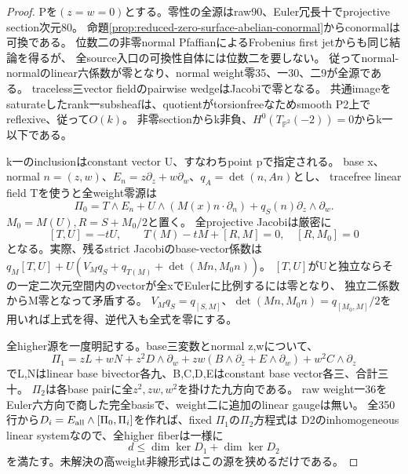 \documentclass[a4paper,11pt]{ltjsarticle}
\theoremstyle{definition}
\begin{document}
\begin{proof}
Pを$(z=w=0)$とする。零性の全源はraw90、Euler冗長十でprojective section次元80。
命題\ref{prop:reduced-zero-surface-abelian-conormal}からconormalは可換である。
位数二の非零normal PfaffianによるFrobenius first jetからも同じ結論を得るが、
全source入口の可換性自体には位数二を要しない。
従ってnormal-normalのlinear六係数が零となり、normal weight零35、一30、二9が全源である。
traceless三vector fieldのpairwise wedgeはJacobiで零となる。
共通imageをsaturateしたrank一subsheafは、quotientがtorsionfreeなためsmooth P2上でreflexive、従って$O(k)$。
非零sectionからk非負、$H^0(T_{\mathbb P^2}(-2))=0$からk一以下である。

k一のinclusionはconstant vector U、すなわちpoint pで指定される。
base x、normal $n=(z,w)$、$E_n=z\partial_z+w\partial_w$、$q_A=\det(n,An)$とし、
tracefree linear field Tを使うと全weight零源は
\[
 \Pi_0=T\wedge E_n+U\wedge(M(x)n\cdot\partial_n)+q_S(n)\partial_z\wedge\partial_w.
\]
$M_0=M(U),R=S+M_0/2$と置く。
全projective Jacobiは厳密に
\[
 [T,U]=-tU,\qquad T(M)-tM+[R,M]=0,
 \quad [R,M_0]=0
\]
となる。実際、残るstrict Jacobiのbase-vector係数は
$q_M[T,U]+U(V_Mq_S+q_{T(M)}+\det(Mn,M_0n))$。
$[T,U]$がUと独立ならその一定二次元空間内のvectorが全xでEulerに比例するには零となり、
独立二係数からM零となって矛盾する。
$V_Mq_S=q_{[S,M]}$、$\det(Mn,M_0n)=q_{[M_0,M]}/2$を用いれば上式を得、逆代入も全式を零にする。

全higher源を一度明記する。base三変数とnormal z,wについて、
\[
 \Pi_1=zL+wN+z^2D\wedge\partial_w+zw(B\wedge\partial_z+E\wedge\partial_w)
              +w^2C\wedge\partial_z
\]
でL,Nはlinear base bivector各九、B,C,D,Eはconstant base vector各三、合計三十。
\(\Pi_2\)は各base pairに全$z^2,zw,w^2$を掛けた九方向である。
raw weight一36をEuler六方向で商した完全basisで、weight二に追加のlinear gaugeは無い。
全350行から$D_i=E_{\rm all}\wedge[\Pi_0,\Pi_i]$を作れば、fixed $\Pi_1$の$\Pi_2$方程式は
D2のinhomogeneous linear systemなので、全higher fiberは一様に
\[
 d\le\dim\ker D_1+\dim\ker D_2
\]
を満たす。未解決の高weight非線形式はこの源を狭めるだけである。


\end{proof}
\end{document}
